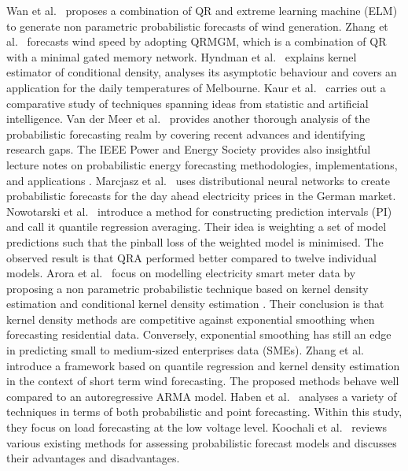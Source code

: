 Wan et al.\ \cite{wan2016direct} proposes a combination of QR and extreme learning machine (ELM) to generate non parametric probabilistic forecasts of wind generation.
Zhang et al.\ \cite{zhang2019wind} forecasts wind speed by adopting QRMGM, which is a combination of QR with a minimal gated memory network.
Hyndman et al.\ \cite{hyndman1996estimating} explains kernel estimator of conditional density, analyses its asymptotic behaviour and covers an application for the daily temperatures of Melbourne.
Kaur et al.\ \cite{kaur2022energy} carries out a comparative study of techniques spanning ideas from statistic and artificial intelligence.
Van der Meer et al.\ \cite{van2018review} provides another thorough analysis of the probabilistic forecasting realm by covering recent advances and identifying research gaps.
The IEEE Power and Energy Society provides also insightful lecture notes on probabilistic energy forecasting methodologies,
implementations, and applications .
Marcjasz et al.\ \cite{probablistic_electricity_forecast2} uses distributional neural networks to create probabilistic forecasts for the day ahead electricity prices in the German market.
Nowotarski et al.\ \cite{nowotarski2015computing} introduce a method for constructing prediction intervals (PI) and call it quantile regression averaging. Their idea is weighting a set of model predictions such that the pinball loss of the weighted model is minimised. The observed result is that QRA performed better compared to twelve individual models.
Arora et al.\ \cite{arora2016forecasting} focus on modelling electricity smart meter data by proposing a non parametric probabilistic technique based on kernel density estimation and conditional kernel density estimation \cite{rosenblatt1969conditional, hyndman1996estimating}. Their conclusion is that kernel density methods are competitive against exponential smoothing when forecasting residential data. Conversely, exponential smoothing has still an edge in predicting small to medium-sized enterprises data (SMEs).
Zhang et al.\ \cite{zhang2020probability} introduce a framework based on quantile regression and kernel density estimation in the context of short term wind forecasting. The proposed methods behave well compared to an autoregressive ARMA model.
Haben et al.\ \cite{haben2018short} analyses a variety of techniques in terms of both probabilistic and point forecasting. Within this study, they focus on load forecasting at the low voltage level.
Koochali et al.\ \cite{koochali2022random} reviews various existing methods for assessing probabilistic forecast models and discusses their advantages and disadvantages.
